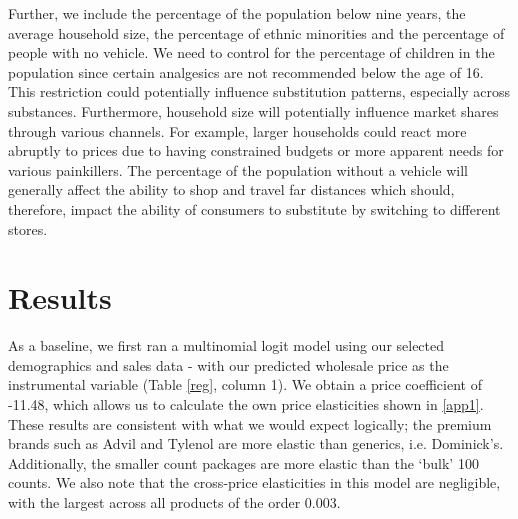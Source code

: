 \documentclass[12pt, authoryear]{elsarticle}
\begin{document}
Further, we include the percentage of the population below nine years, the average household size, the percentage of ethnic minorities and the percentage of people with no vehicle. We need to control for the percentage of children in the population since certain analgesics are not recommended below the age of 16. This restriction could potentially influence substitution patterns, especially across substances. Furthermore, household size will potentially influence market shares through various channels. For example, larger households could react more abruptly to prices due to having constrained budgets or more apparent needs for various painkillers. The percentage of the population without a vehicle will generally affect the ability to shop and travel far distances which should, therefore, impact the ability of consumers to substitute by switching to different stores. 

\section{Results}\label{results}

As a baseline, we first ran a multinomial logit model using our selected demographics and sales data - with our predicted wholesale price as the instrumental variable (Table \ref{reg}, column 1).  We obtain a price coefficient of -11.48, which allows us to calculate the own price elasticities shown in \ref{app1}.  These results are consistent with what we would expect logically; the premium brands such as Advil and Tylenol are more elastic than generics, i.e. Dominick’s.  Additionally, the smaller count packages are more elastic than the ‘bulk’ 100 counts.  We also note that the cross-price elasticities in this model are negligible, with the largest across all products of the order 0.003. 
\end{document}
